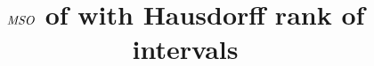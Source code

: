\documentclass{article}
\title{$\mathit{MSO}$ of with Hausdorff rank of intervals}
\begin{document}
\maketitle
\begin{abstract}
\end{abstract}
\tableofcontents


%

%


\end{document}
